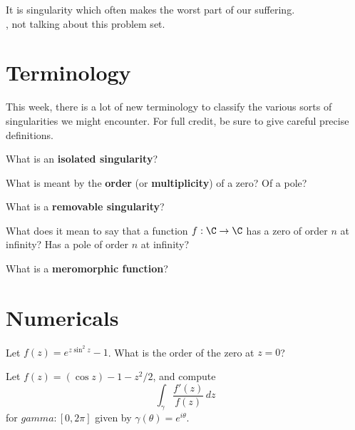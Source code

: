 \documentclass{homework}
\author{Jim Fowler}
\begin{document}
\maketitle

\begin{inspiration}
It is singularity which often makes the worst part of our suffering.\\
, not talking about this problem set.
\end{inspiration}

\section{Terminology}

This week, there is a lot of new terminology to classify the various
sorts of singularities we might encounter.  For full credit, be sure
to give careful precise definitions.

\begin{problem}
  What is an \textbf{isolated singularity}?
\end{problem}

\begin{problem}
  What is meant by the \textbf{order} (or \textbf{multiplicity}) of a zero?  Of a pole?
\end{problem}

\begin{problem}
  What is a \textbf{removable singularity}?
\end{problem}

\begin{problem}
  What does it mean to say that a function $f : \C \to \C$ has a zero of order $n$ at infinity?  Has a pole of order $n$ at infinity?  
\end{problem}

\begin{problem}
What is a \textbf{meromorphic function}?
\end{problem}

\section{Numericals}

\begin{problem}
  Let $f(z) = e^{z \sin^2 z} - 1$.  What is the order of the zero at $z = 0$?
\end{problem}

\begin{problem}
  Let $f(z) = \left( \cos z \right) - 1 - z^2/2$, and compute
  \[
    \int_\gamma \frac{f'(z)}{f(z)} \, dz
  \]
  for $gamma : [0,2\pi]$ given by $\gamma(\theta) = e^{i\theta}$.
\end{problem}
\end{document}
